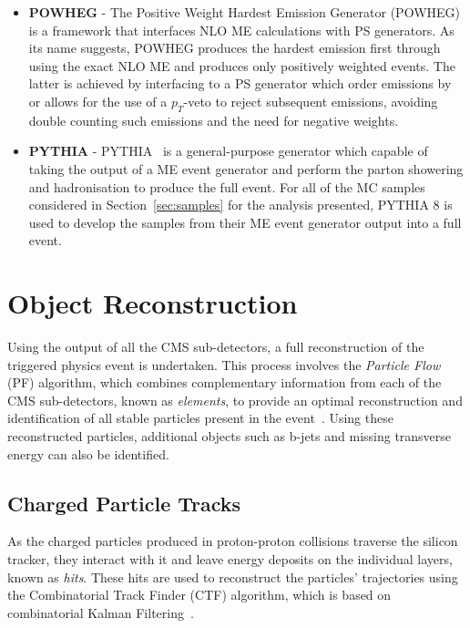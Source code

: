 \begin{itemize}
\item \textbf{POWHEG} - The Positive Weight Hardest Emission Generator (POWHEG)~\cite{Alioli:2010xd} is a framework that interfaces NLO ME calculations with PS generators.
As its name suggests, POWHEG produces the hardest emission first through using the exact NLO ME and produces only positively weighted events.
The latter is achieved by interfacing to a PS generator which order emissions by \pT or allows for the use of a $p_{T}$-veto to reject subsequent emissions, avoiding double counting such emissions and the need for negative weights.
\item \textbf{PYTHIA} - PYTHIA~\cite{Sjostrand:2014zea} is a general-purpose generator which capable of taking the output of a ME event generator and perform the parton showering and hadronisation to produce the full event. For all of the MC samples considered in Section~\ref{sec:samples} for the analysis presented, PYTHIA 8 is used to develop the samples from their ME event generator output into a full event.
\end{itemize}

\section{Object Reconstruction}\label{sec:reco}
Using the output of all the CMS sub-detectors, a full reconstruction of the triggered physics event is undertaken.
This process involves the \emph{Particle Flow} (PF) algorithm, which combines complementary information from each of the CMS sub-detectors, known as \emph{elements}, to provide an optimal reconstruction and identification of all stable particles present in the event~\cite{CMS:2009nxa,CMS:2010eua,CMS-PRF-14-001}.
Using these reconstructed particles, additional objects such as b-jets and missing transverse energy can also be identified.

\subsection{Charged Particle Tracks}\label{subsec:tracks}
As the charged particles produced in proton-proton collisions traverse the silicon tracker, they interact with it and leave energy deposits on the individual layers, known as \emph{hits}.
These hits are used to reconstruct the particles' trajectories using the Combinatorial Track Finder (CTF) algorithm, which is based on combinatorial Kalman Filtering~\cite{Chatrchyan:2014fea,Fruhwirth:1987fm}.

